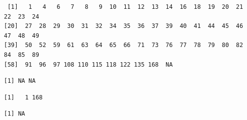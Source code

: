\documentclass[
  letterpaper,
  DIV=11,
  numbers=noendperiod]{scrreprt}
\newenvironment{Shaded}{\begin{snugshade}}{\end{snugshade}}
\newcommand{\AttributeTok}[1]{\textcolor[rgb]{0.40,0.45,0.13}{#1}}
\newcommand{\ConstantTok}[1]{\textcolor[rgb]{0.56,0.35,0.01}{#1}}
\newcommand{\FunctionTok}[1]{\textcolor[rgb]{0.28,0.35,0.67}{#1}}
\newcommand{\NormalTok}[1]{\textcolor[rgb]{0.00,0.23,0.31}{#1}}
\newcommand{\SpecialCharTok}[1]{\textcolor[rgb]{0.37,0.37,0.37}{#1}}
\begin{document}
\begin{Shaded}
\end{Shaded}

\begin{verbatim}
 [1]   1   4   6   7   8   9  10  11  12  13  14  16  18  19  20  21  22  23  24
[20]  27  28  29  30  31  32  34  35  36  37  39  40  41  44  45  46  47  48  49
[39]  50  52  59  61  63  64  65  66  71  73  76  77  78  79  80  82  84  85  89
[58]  91  96  97 108 110 115 118 122 135 168  NA
\end{verbatim}

\begin{Shaded}
\end{Shaded}

\begin{verbatim}
[1] NA NA
\end{verbatim}

\begin{Shaded}
\end{Shaded}

\begin{verbatim}
[1]   1 168
\end{verbatim}

\begin{Shaded}
\end{Shaded}

\begin{verbatim}
[1] NA
\end{verbatim}

\begin{Shaded}
\end{Shaded}
\end{document}
